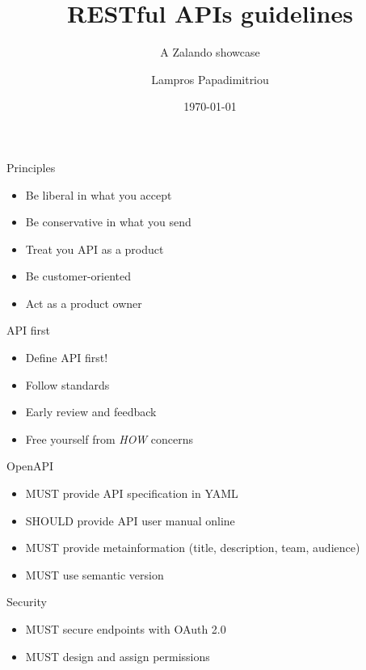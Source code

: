 \documentclass[10pt]{beamer}
\title{RESTful APIs guidelines}
\subtitle{A Zalando showcase}
\date{\today}
\author{Lampros Papadimitriou}
\institute{Check24 Baufinanzierung GmbH}
\begin{document}
\maketitle

\begin{frame}{Principles}

  \begin{itemize}

    \item
          Be liberal in what you accept
    \item
          Be conservative in what you send
    \item
          Treat you API as a product
    \item
          Be customer-oriented
    \item
          Act as a product owner
  \end{itemize}

\end{frame}

\begin{frame}{API first}

  \begin{itemize}

    \item
          Define API first!
    \item
          Follow standards
    \item
          Early review and feedback
    \item
          Free yourself from \emph{HOW} concerns
  \end{itemize}

\end{frame}

\begin{frame}{OpenAPI}

  \begin{itemize}

    \item
          MUST provide API specification in YAML
    \item
          SHOULD provide API user manual online
    \item
          MUST provide metainformation (title, description, team, audience)
    \item
          MUST use semantic version
  \end{itemize}

\end{frame}

\begin{frame}{Security}

  \begin{itemize}

    \item
          MUST secure endpoints with OAuth 2.0
    \item
          MUST design and assign permissions
  \end{itemize}

\end{frame}
\end{document}
